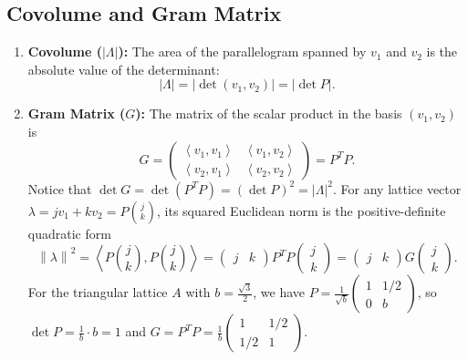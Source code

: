 \documentclass[11pt, a4paper]{article}
\theoremstyle{definition}
\theoremstyle{remark}
\newcommand{\norm}[1]{\left\lVert #1 \right\rVert}
\newcommand{\abs}[1]{\left\lvert #1 \right\rvert}
\newcommand{\inner}[2]{\left\langle #1, #2 \right\rangle}
\begin{document}
\subsection{Covolume and Gram Matrix}
\begin{enumerate}[label=\textbf{\arabic*.}]
    \item \textbf{Covolume ($\abs{\Lambda}$):} The area of the parallelogram spanned by $v_1$ and $v_2$ is the absolute value of the determinant:
    \[
    \abs{\Lambda} = \abs{\det(v_1, v_2)} = \abs{\det P}.
    \]
    \item \textbf{Gram Matrix ($G$):} The matrix of the scalar product in the basis $(v_1, v_2)$ is
    \[
    G = \begin{pmatrix} \inner{v_1}{v_1} & \inner{v_1}{v_2} \\ \inner{v_2}{v_1} & \inner{v_2}{v_2} \end{pmatrix} = P^T P.
    \]
    Notice that $\det G = \det(P^T P) = (\det P)^2 = \abs{\Lambda}^2$. For any lattice vector $\lambda = j v_1 + k v_2 = P \binom{j}{k}$, its squared Euclidean norm is the positive-definite quadratic form
    \[
    \norm{\lambda}^2 = \inner{P \binom{j}{k}}{P \binom{j}{k}} = \begin{pmatrix} j & k \end{pmatrix} P^T P \begin{pmatrix} j \\ k \end{pmatrix} = \begin{pmatrix} j & k \end{pmatrix} G \begin{pmatrix} j \\ k \end{pmatrix}.
    \]
    For the triangular lattice $A$ with $b = \frac{\sqrt{3}}{2}$, we have $P = \frac{1}{\sqrt{b}} \begin{pmatrix} 1 & 1/2 \\ 0 & b \end{pmatrix}$, so $\det P = \frac{1}{b} \cdot b = 1$ and $G = P^T P = \frac{1}{b} \begin{pmatrix} 1 & 1/2 \\ 1/2 & 1 \end{pmatrix}$.
\end{enumerate}
\end{document}
